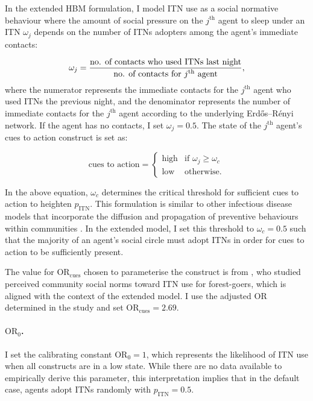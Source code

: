 In the extended HBM formulation, I model ITN use as a social normative behaviour where the amount of social pressure on the $j^{\text{th}}$ agent to sleep under an ITN $\omega_j$ depends on the number of ITNs adopters among the agent's immediate contacts:

\begin{equation}\label{eq:cues-to-action}
    \omega_j=\frac{\text{no. of contacts who used ITNs last night}}{\text{no. of contacts for $j$\textsuperscript{th} agent}},
\end{equation}
where the numerator represents the immediate contacts for the $j^{\text{th}}$ agent who used ITNs the previous night, and the denominator represents the number of immediate contacts for the $j^{\text{th}}$ agent according to the underlying Erdős–Rényi network. If the agent has no contacts, I set $\omega_j=0.5$. The state of the $j^{\text{th}}$ agent's cues to action construct is set as:

\begin{equation}
    \text{cues to action}=\begin{cases}
        \text{high} & \text{if }\omega_j\ge\omega_c \\
        \text{low} & \text{otherwise.}
    \end{cases}
\end{equation}

In the above equation, $\omega_c$ determines the critical threshold for sufficient cues to action to heighten $p_{\text{ITN}}$. This formulation is similar to other infectious disease models that incorporate the diffusion and propagation of preventive behaviours within communities \cite{mao_evaluating_2011, mao_coupling_2012}. In the extended model, I set this threshold to $\omega_c=0.5$ such that the majority of an agent's social circle must adopt ITNs in order for cues to action to be sufficiently present.

The value for $\text{OR}_{\text{cues}}$ chosen to parameterise the construct is from \citet{phok_behavioural_2022}, who studied perceived community social norms toward ITN use for forest-goers, which is aligned with the context of the extended model. I use the adjusted OR determined in the study and set $\text{OR}_{\text{cues}}=2.69$.

\paragraph{$\text{OR}_0$.}I set the calibrating constant $\text{OR}_0=1$, which represents the likelihood of ITN use when all constructs are in a low state. While there are no data available to empirically derive this parameter, this interpretation implies that in the default case, agents adopt ITNs randomly with $p_{\text{ITN}}=0.5$.


